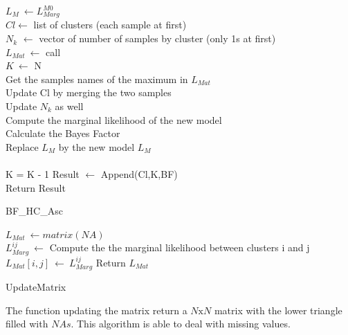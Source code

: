 \documentclass[twocolumn]{article}
\begin{document}
\begin{algorithm}[!]
 \BlankLine
 $L_M\ \leftarrow L_{Marg}^{M0}$\\
 $Cl \leftarrow$ list of clusters (each sample at first)\\
 $N_k$ $\leftarrow$ vector of number of samples by cluster (only 1s at first)\\
 $L_{Mat}\ \leftarrow$ call \\
 $K\ \leftarrow$ N\\
 \BlankLine
    {
        Get the samples names of the maximum in $L_{Mat}$\\
        Update Cl by merging the two samples\\
        Update $N_k$ as well\\
        Compute the marginal likelihood of the new model\\
        Calculate the Bayes Factor\\
        Replace $L_M$ by the new model $L_M$\\
        \\
        K = K - 1
        Result $\leftarrow$ Append(Cl,K,BF)\\
    }
    Return Result
 \caption{BF\_HC\_Asc}
\end{algorithm}
\begin{algorithm}[!]
 $L_{Mat}\ \leftarrow matrix(NA)$\\
    {
        {
            $L_{Marg}^{ij}\ \leftarrow$ Compute the the marginal likelihood between clusters i and j\\
            $L_{Mat}[i,j]\ \leftarrow\ L_{Marg}^{ij}$
        }
    }
    Return $L_{Mat}$
 \caption{UpdateMatrix}
\end{algorithm}
The function updating the matrix return a $N\text{x}N$ matrix with the lower triangle filled with $NAs$.
This algorithm is able to deal with missing values.
\end{document}
